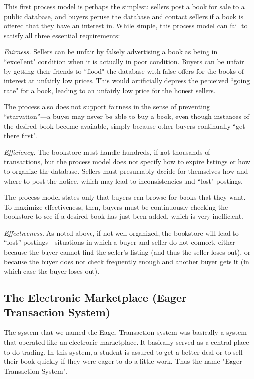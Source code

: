 This first process model is perhaps the simplest: sellers post a book for
sale to a public database, and buyers peruse the database and contact
sellers if a book is offered that they have an interest in.  While simple,
this process model can fail to satisfy all three essential requirements:

{\em Fairness.} Sellers can be unfair by falsely advertising a book
as being in ``excellent" condition when it is actually in poor
condition.  Buyers can be unfair by getting their friends to ``flood"
the database with false offers for the books of interest at unfairly
low prices.  This would artificially depress the perceived ``going
rate" for a book, leading to an unfairly low price for the honest
sellers.

The process also does not support fairness in the sense of
preventing ``starvation''---a buyer may never be able to buy a book,
even though instances of the desired book become available, simply
because other buyers continually ``get there first".

{\em Efficiency.} The bookstore must handle hundreds, if not thousands of
transactions, but the process model does not specify how to expire listings
or how to organize the database.  Sellers must presumably decide for
themselves how and where to post the notice, which may lead to
inconsistencies and ``lost" postings.

The process model states only that buyers can browse for books that they
want.  To maximize effectiveness, then, buyers must be continuously
checking the bookstore to see if a desired book has just been added, which
is very inefficient.

{\em Effectiveness.} As noted above, if not well organized, the
bookstore will lead to ``lost'' postings---situations in which a buyer
and seller do not connect, either because the buyer cannot find the
seller's listing (and thus the seller loses out), or because the
buyer does not check frequently enough and another buyer gets it (in
which case the buyer loses out).


\subsection{The Electronic Marketplace (Eager Transaction System)}

The system that we named the Eager Transaction system was basically a system that operated like an
electronic marketplace.  It basically served as a central place to do
trading.  In this system, a student is assured to get a better deal or
to sell their book quickly if they were eager to do a little work.
Thus the name "Eager Transaction System".

